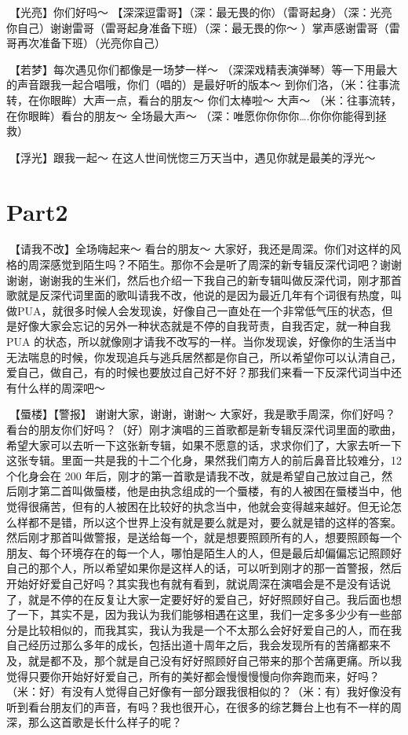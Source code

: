 \documentclass[
]{book}
\begin{document}
🎵【光亮】你们好吗～ 【深深逗雷哥】（深：最无畏的你）（雷哥起身）（深：光亮你自己）谢谢雷哥（雷哥起身准备下班）（深：最无畏的你～ ）掌声感谢雷哥（雷哥再次准备下班）（光亮你自己）

🎵【若梦】每次遇见你们都像是一场梦一样～ （深深戏精表演弹琴）等一下用最大的声音跟我一起合唱哦，你们（唱的）是最好听的版本～ 到你们洛，（米：往事流转，在你眼眸）大声一点，看台的朋友～ 你们太棒啦～ 大声～ （米：往事流转，在你眼眸）看台的朋友～ 全场最大声～ （深：唯愿你你你你\ldots.你你你能得到拯救）

🎵【浮光】跟我一起～ 在这人世间恍惚三万天当中，遇见你就是最美的浮光～

\section{Part2}\label{beijing-20240922-part2}

🎵【请我不改】全场嗨起来～ 看台的朋友～
大家好，我还是周深。你们对这样的风格的周深感觉到陌生吗？不陌生。那你不会是听了周深的新专辑反深代词吧？谢谢谢谢，谢谢我的生米们，然后也介绍一下我自己的新专辑叫做反深代词，刚才那首歌就是反深代词里面的歌叫请我不改，他说的是因为最近几年有个词很有热度，叫做PUA，就很多时候人会发现诶，好像自己一直处在一个非常低气压的状态，但是好像大家会忘记的另外一种状态就是不停的自我苛责，自我否定，就一种自我 PUA 的状态，所以就像刚才请我不改写的一样。当你发现诶，好像你的生活当中无法喘息的时候，你发现追兵与逃兵居然都是你自己，所以希望你可以认清自己，爱自己，做自己，有的时候也要放过自己好不好？那我们来看一下反深代词当中还有什么样的周深吧～

🎵【蜃楼】【警报】 谢谢大家，谢谢，谢谢～
大家好，我是歌手周深，你们好吗？看台的朋友你们好吗？（好）刚才演唱的三首歌都是新专辑反深代词里面的歌曲，希望大家可以去听一下这张新专辑，如果不愿意的话，求求你们了，大家去听一下这张专辑。里面一共是我的十二个化身，果然我们南方人的前后鼻音比较难分，12 个化身会在 200 年后，刚才的第一首歌是请我不改，就是希望自己放过自己，然后刚才第二首叫做蜃楼，他是由执念组成的一个蜃楼，有的人被困在蜃楼当中，他觉得很痛苦，但有的人被困在比较好的执念当中，他就会变得越来越好。但无论怎么样都不是错，所以这个世界上没有就是要么就是对，要么就是错的这样的答案。然后刚才那首叫做警报，是送给每一个，就是想要照顾所有的人，想要照顾每一个朋友、每个环境存在的每一个人，哪怕是陌生人的人，但是最后却偏偏忘记照顾好自己的那个人，所以希望如果你是这样人的话，可以听到刚才的那一首警报，然后开始好好爱自己好吗？其实我也有就有看到，就说周深在演唱会是不是没有话说了，就是不停的在反复让大家一定要好好的爱自己，好好照顾好自己。我后面也想了一下，其实不是，因为我认为我们能够相遇在这里，我们一定多多少少有一些部分是比较相似的，而我其实，我认为我是一个不太那么会好好爱自己的人，而在我自己经历过那么多年的成长，包括出道十周年之后，我会发现所有的苦痛都来不及，就是都不及，那个就是自己没有好好照顾好自己带来的那个苦痛更痛。所以我觉得只要你开始好好爱自己，所有的美好都会慢慢慢慢向你奔跑而来，好吗？（米：好）有没有人觉得自己好像有一部分跟我很相似的？（米：有）我好像没有听到看台朋友们的声音，有吗？我也很开心，在很多的综艺舞台上也有不一样的周深，那么这首歌是长什么样子的呢？
\end{document}
